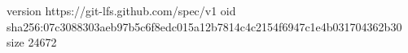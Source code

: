 version https://git-lfs.github.com/spec/v1
oid sha256:07c3088303aeb97b5c6f8edc015a12b7814c4c2154f6947c1e4b031704362b30
size 24672
